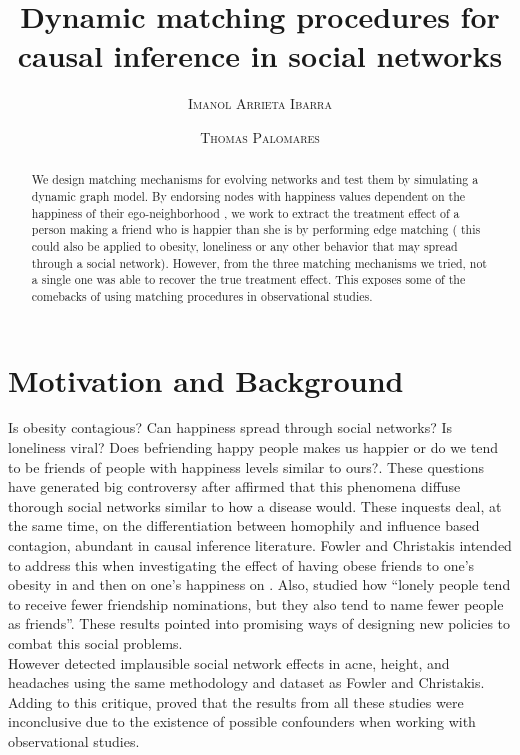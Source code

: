 \documentclass[11pt]{article}
\title{Dynamic matching procedures for causal inference in social networks}
\author{{\textsc{Imanol Arrieta Ibarra}} \\
 \and {\textsc{Thomas Palomares}} \\
}
\begin{document}
\maketitle


\begin{abstract}
We design matching mechanisms for evolving networks and test them by simulating a dynamic graph model. By endorsing nodes with happiness values dependent on the happiness of their ego-neighborhood , we work to extract the treatment effect of a person making a friend who is happier than she is by performing edge matching ( this could also be applied to obesity, loneliness or any other behavior that may spread through a social network). However, from the three matching mechanisms we tried, not a single one was able to recover the true treatment effect. This exposes some of the comebacks of using matching procedures in observational studies. 


\end{abstract}

\newpage

\section{Motivation and Background}

Is obesity contagious? Can happiness spread through social networks? Is loneliness viral? Does befriending happy people makes us happier or do we tend to be friends of people with happiness levels similar to ours?. These questions have generated big controversy after \cite{christakis2007spread} affirmed that this phenomena diffuse thorough social networks similar to how a disease would. These inquests deal, at the same time, on  the differentiation between homophily and influence based contagion, abundant in causal inference literature. Fowler and Christakis intended to address this when investigating the effect of having obese friends to one’s obesity in \citep{christakis2007spread} and then on one’s happiness on \citep{christakis2013social} . Also, \citep{cacioppo2009alone} studied how ``lonely people tend to receive fewer friendship nominations, but they also tend to name fewer people as friends''.  These results pointed into promising ways of designing new policies to combat this social problems.\\

However \citep{cohen2008detecting} detected implausible social network effects in acne, height, and headaches using the same methodology and dataset as Fowler and Christakis. Adding to this critique,\citep{shalizi2011homophily} proved that the results from all these studies were inconclusive due to the existence of possible confounders when working with observational studies. \\
\end{document}
